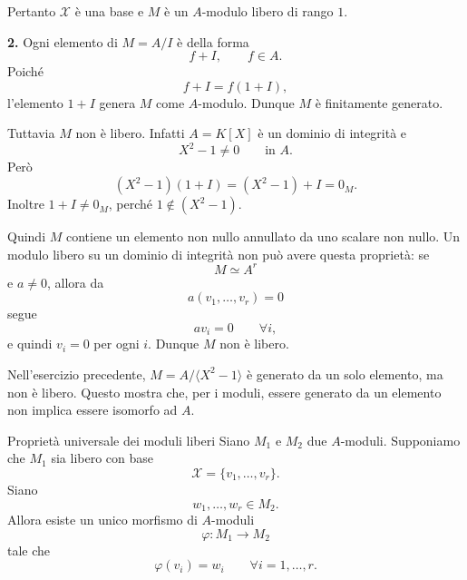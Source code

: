 \documentclass[a4paper]{article}
\begin{document}
\begin{radioactive}
\begin{snippetsolution}{}
    Pertanto \(\mathcal{X}\) è una base e \(M\) è un \(A\)-modulo libero di rango \(1\).

    \textbf{2.} Ogni elemento di \(M=A/I\) è della forma
    \[
        f+I,
        \qquad
        f\in A.
    \]
    Poiché
    \[
        f+I=f(1+I),
    \]
    l'elemento \(1+I\) genera \(M\) come \(A\)-modulo. Dunque \(M\) è finitamente generato.

    Tuttavia \(M\) non è libero. Infatti \(A=K[X]\) è un dominio di integrità e
    \[
        X^2-1\neq 0
        \qquad
        \text{in } A.
    \]
    Però
    \[
        (X^2-1)(1+I)
        =
        (X^2-1)+I
        =
        0_M.
    \]
    Inoltre \(1+I\neq 0_M\), perché \(1\notin (X^2-1)\).

    Quindi \(M\) contiene un elemento non nullo annullato da uno scalare non nullo. Un modulo libero su un dominio di integrità non può avere questa proprietà: se
    \[
        M\simeq A^r
    \]
    e \(a\neq 0\), allora da
    \[
        a(v_1,\ldots,v_r)=0
    \]
    segue
    \[
        av_i=0
        \qquad
        \forall i,
    \]
    e quindi \(v_i=0\) per ogni \(i\). Dunque \(M\) non è libero.
\end{snippetsolution}
\end{radioactive}

\begin{radioactive}
\begin{snippetremark}{}
    Nell'esercizio precedente, \(M=A/\langle X^2-1 \rangle\) è generato da un solo elemento, ma non è libero. Questo mostra che, per i moduli, essere generato da un elemento non implica essere isomorfo ad \(A\).
\end{snippetremark}
\end{radioactive}

\begin{radioactive}
\begin{snippetproposition}{Proprietà universale dei moduli liberi}
    Siano \(M_1\) e \(M_2\) due \(A\)-moduli. Supponiamo che \(M_1\) sia libero con base
    \[
        \mathcal{X}=\{v_1,\ldots,v_r\}.
    \]
    Siano
    \[
        w_1,\ldots,w_r\in M_2.
    \]
    Allora esiste un unico morfismo di \(A\)-moduli
    \[
        \varphi\colon M_1\to M_2
    \]
    tale che
    \[
        \varphi(v_i)=w_i
        \qquad
        \forall i=1,\ldots,r.
    \]
\end{snippetproposition}
\end{radioactive}
\end{document}
